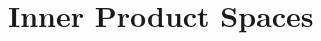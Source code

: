 \documentclass[class=linear-algebra,crop=false]{standalone}
\begin{document}
\chapter{Inner Product Spaces}
\end{document}
